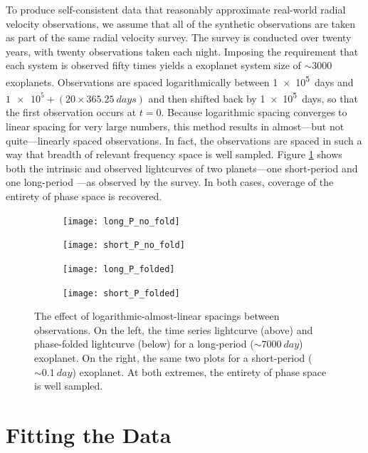\documentclass[12pt,manuscript]{aastex}
\begin{document}
To produce self-consistent data that reasonably approximate real-world radial velocity observations, we assume that all of the synthetic observations are taken as part of the same radial velocity survey.
The survey is conducted over twenty years, with twenty observations taken each night.
Imposing the requirement that each system is observed fifty times yields a exoplanet system size of $\sim 3000$ exoplanets. 
Observations are spaced logarithmically between \SI{1e5}{days} and $\num{1e5} + (20 \times \SI{365.25}{days})$ and then shifted back by \SI{1e5}{days}, so that the first observation occurs at $t=0$.
Because logarithmic spacing converges to linear spacing for very large numbers, this method results in almost---but not quite---linearly spaced observations.
In fact, the observations are spaced in such a way that breadth of relevant frequency space is well sampled. 
Figure \ref{fig: periods} shows both the intrinsic and observed lightcurves of two planets---one short-period and one long-period ---as observed by the survey.
In both cases, coverage of the entirety of phase space is recovered.

\begin{figure}
  \centering
  
  \begin{subfigure}[b]{.45\linewidth}
  \texttt{[image: long\_P\_no\_fold]}
  \end{subfigure}
  \begin{subfigure}[b]{.45\linewidth}
  \texttt{[image: short\_P\_no\_fold]}
  \end{subfigure}
  
  
  \begin{subfigure}[b]{.45\linewidth}
  \texttt{[image: long\_P\_folded]}
  \end{subfigure}
  \begin{subfigure}[b]{.45\linewidth}
  \texttt{[image: short\_P\_folded]}
  \end{subfigure}

  \caption{The effect of logarithmic-almost-linear spacings between observations. On the left, the time series lightcurve (above) and phase-folded lightcurve (below) for a long-period ($\sim \SI{7000}{day}$) exoplanet. On the right, the same two plots for a short-period ($\sim \SI{0.1}{day}$) exoplanet. At both extremes, the entirety of phase space is well sampled.}
  \label{fig: periods}
\end{figure}



\section{Fitting the Data}
\label{section: fitting}
\end{document}
